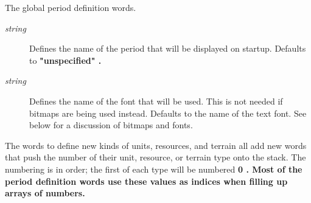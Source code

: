 The global period definition words.
\begin{description}
\item[{%
\it string}]
Defines the name of the period that will be displayed on startup.
Defaults to %
\bf "unspecified"\rm%
.
\item[{%
\it string}]
Defines the name of the font that will be used.  This is not needed
if bitmaps are being used instead.  Defaults to the name of the text font.
See below for a discussion of bitmaps and fonts.
\end{description}\par\noindent
The words to define new kinds of units, resources, and terrain all add
new words that push the number of their unit,
resource, or terrain type onto the stack.  The numbering is in order;
the first of each type will be numbered %
\bf 0\rm%
.  Most of the period
definition words use these values as indices when filling up arrays
of numbers.
